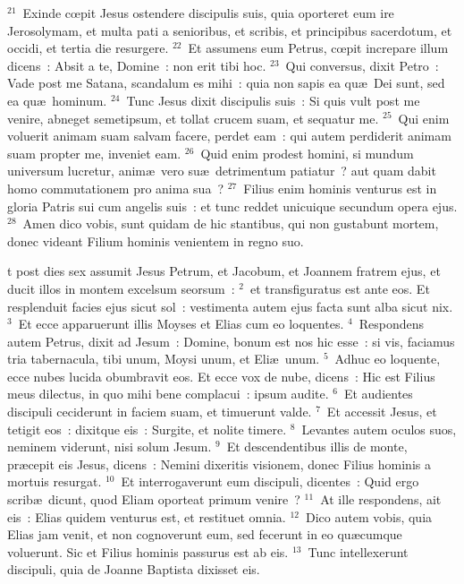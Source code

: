 ${}^{21}$~Exinde cœpit Jesus ostendere discipulis suis, quia oporteret eum ire Jerosolymam, et multa pati a senioribus, et scribis, et principibus sacerdotum, et occidi, et tertia die resurgere.
${}^{22}$~Et assumens eum Petrus, cœpit increpare illum dicens~: Absit a te, Domine~: non erit tibi hoc.
${}^{23}$~Qui conversus, dixit Petro~: Vade post me Satana, scandalum es mihi~: quia non sapis ea qu\ae\ Dei sunt, sed ea qu\ae\ hominum.
${}^{24}$~Tunc Jesus dixit discipulis suis~: Si quis vult post me venire, abneget semetipsum, et tollat crucem suam, et sequatur me.
${}^{25}$~Qui enim voluerit animam suam salvam facere, perdet eam~: qui autem perdiderit animam suam propter me, inveniet eam.
${}^{26}$~Quid enim prodest homini, si mundum universum lucretur, anim\ae\ vero su\ae\ detrimentum patiatur~? aut quam dabit homo commutationem pro anima sua~?
${}^{27}$~Filius enim hominis venturus est in gloria Patris sui cum angelis suis~: et tunc reddet unicuique secundum opera ejus.
${}^{28}$~Amen dico vobis, sunt quidam de hic stantibus, qui non gustabunt mortem, donec videant Filium hominis venientem in regno suo.

\bchapter
{}t post dies sex assumit Jesus Petrum, et Jacobum, et Joannem fratrem ejus, et ducit illos in montem excelsum seorsum~:
${}^{2}$~et transfiguratus est ante eos. Et resplenduit facies ejus sicut sol~: vestimenta autem ejus facta sunt alba sicut nix.
${}^{3}$~Et ecce apparuerunt illis Moyses et Elias cum eo loquentes.
${}^{4}$~Respondens autem Petrus, dixit ad Jesum~: Domine, bonum est nos hic esse~: si vis, faciamus tria tabernacula, tibi unum, Moysi unum, et Eli\ae\ unum.
${}^{5}$~Adhuc eo loquente, ecce nubes lucida obumbravit eos. Et ecce vox de nube, dicens~: Hic est Filius meus dilectus, in quo mihi bene complacui~: ipsum audite.
${}^{6}$~Et audientes discipuli ceciderunt in faciem suam, et timuerunt valde.
${}^{7}$~Et accessit Jesus, et tetigit eos~: dixitque eis~: Surgite, et nolite timere.
${}^{8}$~Levantes autem oculos suos, neminem viderunt, nisi solum Jesum.
${}^{9}$~Et descendentibus illis de monte, pr\ae cepit eis Jesus, dicens~: Nemini dixeritis visionem, donec Filius hominis a mortuis resurgat.
${}^{10}$~Et interrogaverunt eum discipuli, dicentes~: Quid ergo scrib\ae\ dicunt, quod Eliam oporteat primum venire~?
${}^{11}$~At ille respondens, ait eis~: Elias quidem venturus est, et restituet omnia.
${}^{12}$~Dico autem vobis, quia Elias jam venit, et non cognoverunt eum, sed fecerunt in eo qu\ae cumque voluerunt. Sic et Filius hominis passurus est ab eis.
${}^{13}$~Tunc intellexerunt discipuli, quia de Joanne Baptista dixisset eis.


